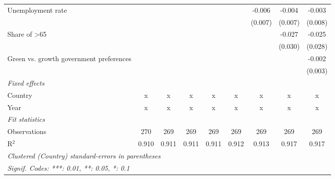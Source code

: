 \begin{table}[htbp]
\begin{tabular}{lcccccccc}
      Unemployment rate                                       &         &         &         &         &         & -0.006  & -0.004  & -0.003\\   
                                                              &         &         &         &         &         & (0.007) & (0.007) & (0.008)\\   
      Share of >65                                            &         &         &         &         &         &         & -0.027  & -0.025\\   
                                                              &         &         &         &         &         &         & (0.030) & (0.028)\\   
      Green vs. growth government preferences                 &         &         &         &         &         &         &         & -0.002\\   
                                                              &         &         &         &         &         &         &         & (0.003)\\   
      \emph{Fixed effects}\\
      Country                                                 & x       & x       & x       & x       & x       & x       & x       & x\\  
      Year                                                    & x       & x       & x       & x       & x       & x       & x       & x\\  
      \midrule \emph{Fit statistics}\\
      Observations                                            & 270     & 269     & 269     & 269     & 269     & 269     & 269     & 269\\  
      R$^2$                                                   & 0.910   & 0.911   & 0.911   & 0.911   & 0.912   & 0.913   & 0.917   & 0.917\\  
      \midrule
      \multicolumn{9}{l}{\emph{Clustered (Country) standard-errors in parentheses}}\\
      \multicolumn{9}{l}{\emph{Signif. Codes: ***: 0.01, **: 0.05, *: 0.1}}\\
   \end{tabular}
\end{table}


